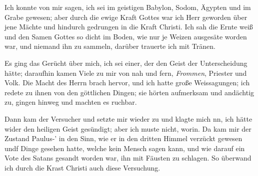 Ich konnte von mir sagen, ich sei im geistigen Babylon, Sodom,
Ägypten und im Grabe gewesen; aber durch die ewige Kraft Gottes
war ich Herr geworden über jene Mächte und hindurch gedrungen
in die Kraft Christi. Ich sah die Ernte weiß und den Samen
Gottes so dicht im Boden, wie nur je Weizen ausgesäte worden
war, und niemand ihn zu sammeln, darüber trauerte ich mit
Tränen.

Es ging das Gerücht über mich, ich sei einer, der den Geist
der Unterscheidung hätte; daraufhin kamen Viele zu mir von nah
und fern, \textit{Frommen}, Priester und Volk. Die Macht des Herrn
brach hervor, und ich hatte große Weissagungen; ich redete zu
ihnen von den göttlichen Dingen; sie hörten aufmerksam und 
andächtig zu, gingen hinweg und machten es ruchbar.


Dann kam der Versucher und setzte mir wieder zu und
klagte mich nn, ich hätte wider den heiligen Geist gesündigt; aber
ich muste nicht, worin. Da kam mir der Zustand Paulus-’ in
den Sinn, wie er in den dritten Himmel verzückt gewesen undf
Dinge gesehen hatte, welche kein Mensch sagen kann, und wie
darauf ein Vote des Satans gesandt worden war, ihn mit
Fäusten zu schlagen. So überwand ich durch die Krast Christi
auch diese Versuchung.

